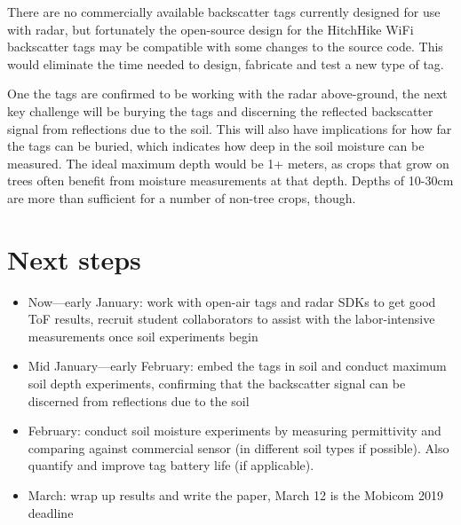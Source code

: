 \documentclass[12pt]{article}
\begin{document}


There are no commercially available backscatter tags currently designed
for use with radar, but fortunately the open-source design for the
HitchHike WiFi backscatter tags may be compatible with some changes to
the source code. This would eliminate the time needed to design,
fabricate and test a new type of tag.

One the tags are confirmed to be working with the radar above-ground,
the next key challenge will be burying the tags and discerning the
reflected backscatter signal from reflections due to the soil. This
will also have implications for how far the tags can be buried, which
indicates how deep in the soil moisture can be measured. The ideal
maximum depth would be 1+ meters, as crops that grow on trees often
benefit from moisture measurements at that depth. Depths of 10-30cm are
more than sufficient for a number of non-tree crops, though.

\section*{Next steps}
\begin{itemize}
\item Now---early January: work with open-air tags and radar SDKs to get
  good ToF results, recruit student collaborators to assist with the
  labor-intensive measurements once soil experiments begin
\item Mid January---early February: embed the tags in soil and conduct
  maximum soil depth experiments, confirming that the backscatter
  signal can be discerned from reflections due to the soil
\item February: conduct soil moisture experiments by measuring
  permittivity and comparing against commercial sensor (in different
  soil types if possible). Also quantify and improve tag battery life
  (if applicable).
\item March: wrap up results and write the paper, March 12 is the
  Mobicom 2019 deadline
\end{itemize}
\end{document}
